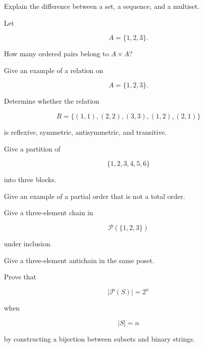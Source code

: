 \begin{exercise}[1]
Explain the difference between a set, a sequence, and a multiset.
\end{exercise}

\begin{exercise}[1]
Let

\[
A=\{1,2,3\}.
\]

How many ordered pairs belong to \(A\times A\)?
\end{exercise}

\begin{exercise}[1]
Give an example of a relation on

\[
A=\{1,2,3\}.
\]
\end{exercise}

\begin{exercise}[1]
Determine whether the relation

\[
R=\{(1,1),(2,2),(3,3),(1,2),(2,1)\}
\]

is reflexive, symmetric, antisymmetric, and transitive.
\end{exercise}

\begin{exercise}[1]
Give a partition of

\[
\{1,2,3,4,5,6\}
\]

into three blocks.
\end{exercise}

\begin{exercise}[1]
Give an example of a partial order that is not a total order.
\end{exercise}

\begin{exercise}[1]
Give a three-element chain in

\[
\mathcal{P}(\{1,2,3\})
\]

under inclusion.
\end{exercise}

\begin{exercise}[1]
Give a three-element antichain in the same poset.
\end{exercise}

\begin{exercise}[2]
Prove that

\[
|\mathcal{P}(S)|=2^n
\]

when

\[
|S|=n
\]

by constructing a bijection between subsets and binary strings.
\end{exercise}

